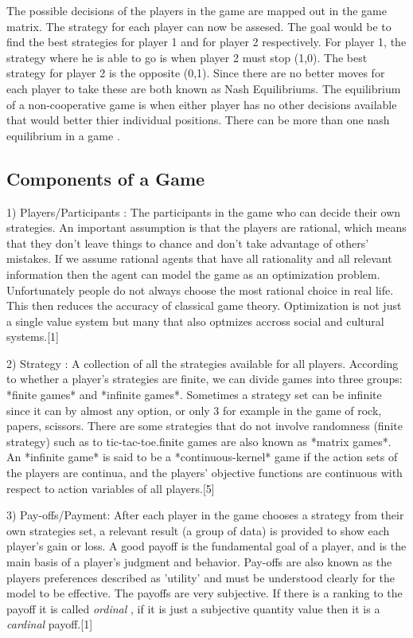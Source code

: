 The possible decisions of the players in the game are
mapped out in the game matrix. The strategy for each player 
can now be assesed. The goal would be to find the best strategies
for player 1 and for player 2 respectively. For player 1, 
the strategy where he is able to go is when player 2 must stop
(1,0). The best strategy for player 2 is the opposite (0,1).
Since there are no better moves for each player to take these 
are both known as Nash Equilibriums. The equilibrium of a non-cooperative
game is when either player has no other decisions available that 
would better thier individual positions. There can be more than 
one nash equilibrium in a game .

\subsection{Components of a Game}

1) Players/Participants :  The  participants  in  the  game  who  
can  decide  their  own  strategies.  An  important  assumption  
is  that  the  players are rational, which means that they don’t 
leave things to chance and don’t take advantage of others’ mistakes. 
If we assume rational agents that have all rationality and all relevant 
information then the agent can model the game as an optimization problem. 
Unfortunately people do not always choose the most rational choice in 
real life. This then reduces the accuracy of classical game theory. 
Optimization is not just a single value system but many that also 
optmizes accross social and cultural systems.[1]

2) Strategy : A collection of all the strategies available for all 
players. According to whether a player’s strategies are finite, we can 
divide games into three groups: *finite games* and *infinite games*. 
Sometimes a strategy set can be infinite since it can by almost any option,
or only 3 for example in the game of rock, papers, scissors. There are
some strategies that do not involve randomness (finite strategy) such 
as to tic-tac-toe.finite games are also known as *matrix  games*. An  
*infinite  game*  is  said  to  be  a *continuous-kernel*  game if  
the  action  sets  of the players are continua, and the players’ 
objective functions are continuous with respect to action variables 
of all players.[5]

3) Pay-offs/Payment: After each player in the game chooses a  strategy
from  their  own  strategies  set,  a  relevant  result  
(a  group of data) is provided to show each player’s gain or loss.
A good payoff is the fundamental goal of a player, and is the main
basis of a player’s judgment and behavior. Pay-offs are also known
as the players preferences described as 'utility' and must be 
understood clearly for the model to be effective. The payoffs are
very subjective. If there is a ranking to the payoff it is called 
\textit{ordinal} , if it is just a subjective quantity value then it is 
a \textit{cardinal} payoff.[1]

